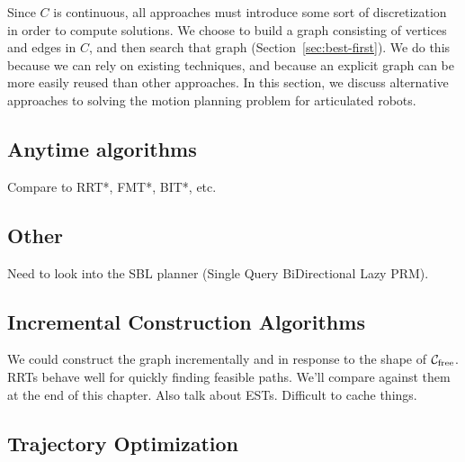 Since $C$ is continuous,
all approaches must introduce some sort of discretization
in order to compute solutions.
We choose to build a graph consisting of vertices and edges in $C$,
and then search that graph (Section~\ref{sec:best-first}).
We do this because we can rely on existing techniques,
and because an explicit graph can be more easily reused than other
approaches.
In this section, we discuss alternative approaches to solving
the motion planning problem for articulated robots.

%

\subsection{Anytime algorithms}

Compare to RRT*, FMT*, BIT*, etc.

\subsection{Other}

Need to look into the SBL planner \cite{sanchezante2001sbl}
(Single Query BiDirectional Lazy PRM).

\subsection{Incremental Construction Algorithms}

We could construct the graph incrementally and in response to the shape
of $\mathcal{C}_{\mbox{\scriptsize free}}$.
RRTs behave well for quickly finding feasible paths.
We'll compare against them at the end of this chapter.
Also talk about ESTs.
Difficult to cache things.

\subsection{Trajectory Optimization}

